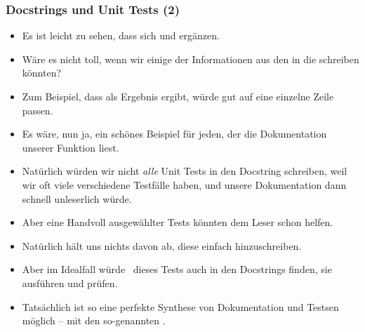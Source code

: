 \documentclass[aspectratio=169,mathserif,notheorems]{beamer}%
\begin{document}
\begin{frame}%
\frametitle{Docstrings und Unit Tests (2)}%
\begin{itemize}%
\item Es ist leicht zu sehen, dass sich  und  ergänzen.%
%
\item<2-> Wäre es nicht toll, wenn wir einige der Informationen aus den  in die   schreiben könnten?
%
\item<3-> Zum Beispiel, dass  als Ergebnis  ergibt, würde gut auf eine einzelne Zeile passen.%
%
\item<4-> Es wäre, nun ja, ein schönes Beispiel für jeden, der die Dokumentation unserer Funktion liest.%
%
\item<5-> Natürlich würden wir nicht \emph{alle} Unit Tests in den Docstring schreiben, weil wir oft viele verschiedene Testfälle haben, und unsere Dokumentation dann schnell unleserlich würde.%
%
\item<6-> Aber eine Handvoll ausgewählter Tests könnten dem Leser schon helfen.%
%
\item<7-> Natürlich hält uns nichts davon ab, diese einfach hinzuschreiben.%
%
\item<8-> Aber im Idealfall würde \pytest\ dieses Tests auch in den Docstrings finden, sie ausführen und prüfen.%
%
\item<9-> Tatsächlich ist so eine perfekte Synthese von Dokumentation und Testsen möglich -- mit den so-genannten .%
%
\end{itemize}%
\end{frame}%
%
\end{document}
